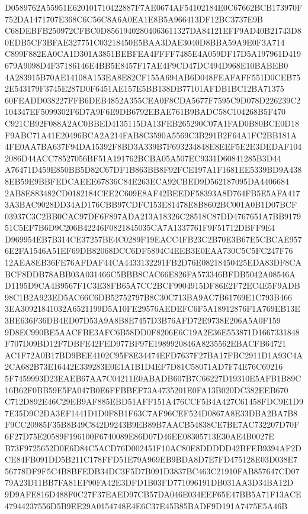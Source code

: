 \documentclass[UTF8,fontset=fandol,zihao=-4,a4paper]{ctexart}
\begin{document}
{{D0589762A55951E620101710422887F7AE0674AF54102184E0C67662BCB173970F752DA1471707E368C6C56C8A6A0EA1E8B5A966413DF12BC3737E9B
C68DEBFB250972CFBC0D85619402804063611327DA84121EFF9AD40B21743D80EDB5CF3BFAE327751C03218450E5BAA3DAE3040D8BBA59A9E0F3A714
C899F882EA0CA1D301A3851BEBFEA4FFFF7485E4A059DF17D5A197961D419679A9098D4F37186146E4BB5E8457F17AE4F9CD47DC494D968E10BABEB0
4A283915B70AE14108A153EA8E82CF155A694AB6D048FEAFAFF551D0CEB752E543179F3745E287D0F6451AE157E5BB138DB77101AFDB1BC12BA71375
60FEADD038227FFB6DEB4852A355CEA0F8CDA5677F7595C9D078D226239C2104347EF5099302F6D7A9F6E9DB6792EBAE761B9BADC58C104268B5F470
C921CB92F088A2AC0BBED4135115DA13FEB265290C07A1FAD0B80BCE0D18F9ABC71A41E20496BCA2A214FAB8C3590A5569C3B291B2F64A1FC2BB181A
4FE0AA7BA637F94DA15392F8BD3A339B7F693234848E8EEF5E2E3DEDAF1042086D44ACC78527056BF51A191762BCBA05A507EC9331D60841285B3D44
A76471D459E850BB5D82C67DF1B863BB8F92FCE197A1F1681EE5339BD9A4388EB59E9BBFEDCAEEE67836C84E263ECA92CBED9D562187095DA4406684
2AB8E883482CD0182184CEE2C609E8AF42BEEDF58393A8D764FB5E5AFA4173A3BAC9028DD34AD176CBB97CDFC153E81478E8B8602BC001A0B1D07BCF
03937C3C2BB0CAC97DF6F897ADA213A18326C28518C87DD4767651A7BB917951C5EF7B6D9C206B42246F0821845035CA7A1337761F9F51712DBFF9E4
D969954EB7B314CE37257BE4C0289F19EACC4FB23C2B70E3B67E5CBCAE9576E2FA1546A51EF69DB82068DCC6DF5894C4EEB3E0EAA730C5C5FC247F76
12AEA8EB36FE76AFDAF44CA4433132291FB2D76E08218450425EDA83DF8CABCF8DDB78ABB03A031466C5BBB8CAC66E826FA573346BFDB5042A08546A
D1195D9CA4B9567F1C3E38FB65A7CC2BCF9904915DF86E2F72EC4E5F9ADB98C1B2A923ED5AC66C6DB52752797B8C30C713BA9AC7B61769E1C793B466
3EA30921841032A6521199D5A10FE29576AEDEFC6F5A18912876F1A769EB13E3BE636F36DB4ED07D53A9A8B8E7457D3B76AFD72E9738E206A5A0F159
9D8EC990BE5AACFBE3AFC6B58DD0F8206E6C19A2E36E553871D1667331848F707D09BD12F7DBFE42FED977BF97E1989920846A8235562EBACFB64721
AC1F72A0B17BD9BEE4102C95F8E34474EFD7637F27BA17FBC2911D1A93C4A2CA682B73E16442E339283E0E1A1B1D4EF7D81C58071AD7F74E76C69216
5F7459993D23EAEB67AA7C04211E0ABADB607B7C66227D19310E5AFB1B89C16B62F0BB59E5FA047B0E6FFBBEF73A4735201E0FA13B020DC382EEB670
C712D892E46C29EB9AF885EBD51AFF151A476CCF5B4A427C61458FDC9E1D97E35D9C2DA3EF1441D1D0F8B1F63C7AF96CEF524D0867A8E33DBA2BA7B8
F9CC20985F35B8B49C842D9243B9EB89B7AACB54838CE7BE7AC732207D70F6F27D75E20589F196100F6740089E86D07D46EE08305713E30AE4B0027E
B73F9725652D0E6D84C5ACD76D002451F10AC80E8DDDDD42BFEB9394AF2DCE84FB091DD5B211C178FFD51E79A969EB9BDA8D7E7FD475128E03D038E7
56778DF9F5C4B8BFEDB34DC3F5D7B091D3837BC463C21910FAB857647CD0779A23D11BB7FA81EF90FA42E3DFD1B03FD771096191DB031AA3D34BA12D
9D9AFE816D488F0C27F37EAED97CB57DA046E034EEF65E47BB5A71F13ACE47944237556D5B9EE29A0154748E4E6C37E45B85BADF9D191A7475E5A46B
}}
\end{document}
